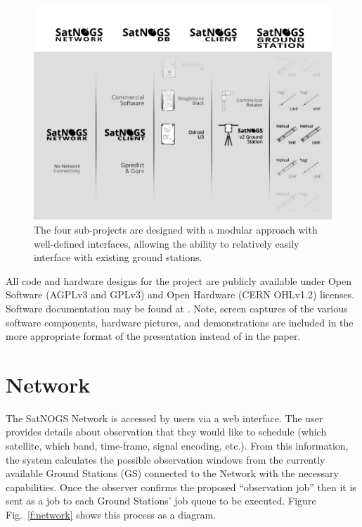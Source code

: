 \documentclass[conference,letterpaper,12pt]{IEEEtran}
\newcommand{\figref}[1]{Fig.~\ref{#1}}
\newlength{\imgwidth}
\begin{document}
\begin{figure}[b]
\centering
\includegraphics[width=\imgwidth]{fig/components-modular}%
\caption{The four sub-projects are designed with a modular approach with well-defined interfaces, allowing the ability to relatively easily interface with existing ground stations.}
\label{f:modular}
\end{figure}

All code and hardware designs for the project are publicly available \cite{SatNOGS-github} under Open Software (AGPLv3 and GPLv3) and Open Hardware (CERN OHLv1.2) licenses.
Software documentation may be found at \cite{SatNOGS-docs}.
Note, screen captures of the various software components, hardware pictures, and demonstrations are included in the more appropriate format of the presentation instead of in the paper.


\section{Network}
The SatNOGS Network is accessed by users via a web interface.
The user provides details about observation that they would like to schedule (which satellite, which band, time-frame, signal encoding, etc.).
From this information, the system calculates the possible observation windows from the currently available Ground Stations (GS) connected to the Network with the necessary capabilities.
Once the observer confirms the proposed ``observation job'' then it is sent as a job to each Ground Stations' job queue to be executed.
Figure \figref{f:network} shows this process as a diagram.
\end{document}
